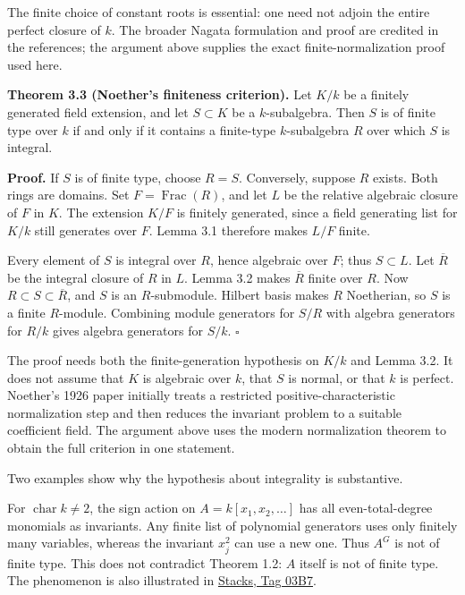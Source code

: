 \documentclass[
]{article}
\begin{document}
The finite choice of constant roots is essential: one need not adjoin
the entire perfect closure of \(k\). The broader Nagata formulation and
proof are credited in the references; the argument above supplies the
exact finite-normalization proof used here.

\protect{}\label{theorem-3-3}{}

\textbf{Theorem 3.3 (Noether's finiteness criterion).} Let \(K/k\) be a
finitely generated field extension, and let \(S\subset K\) be a
\(k\)-subalgebra. Then \(S\) is of finite type over \(k\) if and only if
it contains a finite-type \(k\)-subalgebra \(R\) over which \(S\) is
integral.

\textbf{Proof.} If \(S\) is of finite type, choose \(R=S\). Conversely,
suppose \(R\) exists. Both rings are domains. Set
\(F=\operatorname{Frac}(R)\), and let \(L\) be the relative algebraic
closure of \(F\) in \(K\). The extension \(K/F\) is finitely generated,
since a field generating list for \(K/k\) still generates over \(F\).
Lemma 3.1 therefore makes \(L/F\) finite.

Every element of \(S\) is integral over \(R\), hence algebraic over
\(F\); thus \(S\subset L\). Let \(\overline R\) be the integral closure
of \(R\) in \(L\). Lemma 3.2 makes \(\overline R\) finite over \(R\).
Now \(R\subset S\subset\overline R\), and \(S\) is an \(R\)-submodule.
Hilbert basis makes \(R\) Noetherian, so \(S\) is a finite \(R\)-module.
Combining module generators for \(S/R\) with algebra generators for
\(R/k\) gives algebra generators for \(S/k\). \(\square\)

The proof needs both the finite-generation hypothesis on \(K/k\) and
Lemma 3.2. It does not assume that \(K\) is algebraic over \(k\), that
\(S\) is normal, or that \(k\) is perfect. Noether's 1926 paper
initially treats a restricted positive-characteristic normalization step
and then reduces the invariant problem to a suitable coefficient field.
The argument above uses the modern normalization theorem to obtain the
full criterion in one statement.

Two examples show why the hypothesis about integrality is substantive.

For \(\operatorname{char}k\ne2\), the sign action on
\(A=k [x_1,x_2,\ldots]\) has all even-total-degree monomials as
invariants. Any finite list of polynomial generators uses only finitely
many variables, whereas the invariant \(x_j^2\) can use a new one. Thus
\(A^G\) is not of finite type. This does not contradict Theorem 1.2:
\(A\) itself is not of finite type. The phenomenon is also illustrated
in
\href{https://kokunoyumeto.github.io/stacks-zh-hans-cn/en/algebra.html\#example-bad-invariants}{Stacks,
Tag 03B7}.
\end{document}
